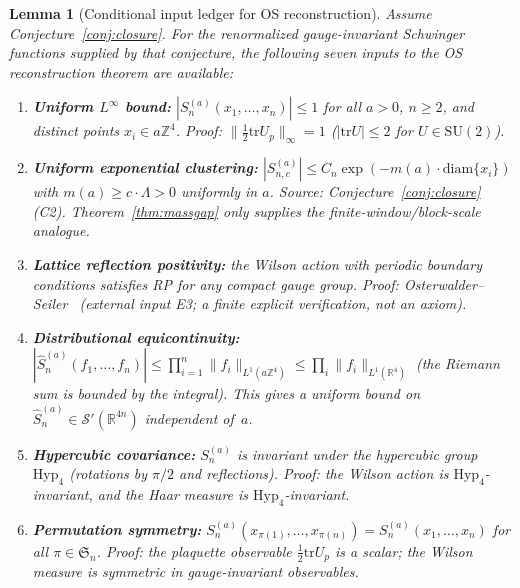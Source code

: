 \documentclass[11pt]{article}
\newtheorem{lemma}[theorem]{Lemma}
\theoremstyle{definition}
\newcommand{\SU}{\mathrm{SU}}
\newcommand{\tr}{\mathrm{tr}}
\newcommand{\R}{\mathbb{R}}
\newcommand{\Z}{\mathbb{Z}}
\begin{document}
\begin{lemma}[Conditional input ledger for OS reconstruction]%
\label{lem:os-inputs}
Assume Conjecture~\ref{conj:closure}.  For the renormalized
gauge-invariant Schwinger functions supplied by that conjecture, the
following seven inputs to the OS reconstruction theorem are available:

\begin{enumerate}[nosep,label=\textup{(I\arabic*)}]
\item \textbf{Uniform $L^\infty$ bound:}
$|S_n^{(a)}(x_1,\ldots,x_n)|\le 1$ for all $a>0$, $n\ge 2$,
and distinct points $x_i\in a\Z^4$.
\emph{Proof:} $\|\frac{1}{2}\tr U_p\|_\infty=1$
\textup{(}$|\tr U|\le 2$ for $U\in\SU(2)$\textup{)}.

\item \textbf{Uniform exponential clustering:}
$|S_{n,c}^{(a)}|\le C_n\exp(-m(a)\cdot\mathrm{diam}\{x_i\})$
with $m(a)\ge c\cdot\Lambda>0$ uniformly in $a$.
\emph{Source:} Conjecture~\ref{conj:closure}(C2).  Theorem~\ref{thm:massgap}
only supplies the finite-window/block-scale analogue.

\item \textbf{Lattice reflection positivity:}
the Wilson action with periodic boundary conditions
satisfies RP for any compact gauge group.
\emph{Proof:} Osterwalder--Seiler~\cite{OS78}
\textup{(}external input E3; a finite explicit
verification, not an axiom\textup{)}.

\item \textbf{Distributional equicontinuity:}
$|\hat S_n^{(a)}(f_1,\ldots,f_n)|
\le\prod_{i=1}^n\|f_i\|_{L^1(a\Z^4)}
\le\prod_i\|f_i\|_{L^1(\R^4)}$
\textup{(}the Riemann sum is bounded by the integral\textup{)}.
This gives a uniform bound on
$\hat S_n^{(a)}\in\mathcal{S}'(\R^{4n})$ independent of~$a$.

\item \textbf{Hypercubic covariance:}
$S_n^{(a)}$ is invariant under the hypercubic group
$\mathrm{Hyp}_4$ \textup{(}rotations by $\pi/2$
and reflections\textup{)}.  \emph{Proof:} the Wilson action
is $\mathrm{Hyp}_4$-invariant, and the Haar measure is
$\mathrm{Hyp}_4$-invariant.

\item \textbf{Permutation symmetry:}
$S_n^{(a)}(x_{\pi(1)},\ldots,x_{\pi(n)})
=S_n^{(a)}(x_1,\ldots,x_n)$ for all $\pi\in\mathfrak{S}_n$.
\emph{Proof:} the plaquette observable
$\frac{1}{2}\tr U_p$ is a scalar; the Wilson measure
is symmetric in gauge-invariant observables.


\end{enumerate}
\end{lemma}
\end{document}
